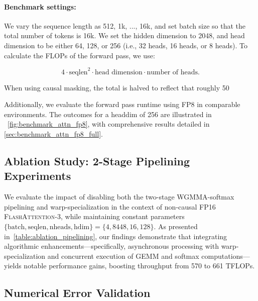 \begin{enumerate}
\paragraph{Benchmark settings:} We vary the sequence length as 512, 1k, ..., 16k, and set batch size so that the total number of tokens is 16k. We set the hidden dimension to 2048, and head dimension to be either 64, 128, or 256 (i.e., 32 heads, 16 heads, or 8 heads). To calculate the FLOPs of the forward pass, we use:

\begin{equation*}
  4 \cdot \text{seqlen}^2 \cdot \text{head dimension} \cdot \text{number of heads}.
\end{equation*}

When using causal masking, the total is halved to reflect that roughly 50%

Additionally, we evaluate the forward pass runtime using FP8 in comparable environments. The outcomes for a headdim of 256 are illustrated in ~\cref{fig:benchmark_attn_fp8}, with comprehensive results detailed in \cref{sec:benchmark_attn_fp8_full}.

\subsection{Ablation Study: 2-Stage Pipelining Experiments}
\label{sec:2-stage-pipelining-experiments}

We evaluate the impact of disabling both the two-stage WGMMA-softmax pipelining and warp-specialization in the context of non-causal FP16 \textsc{FlashAttention-3}, while maintaining constant parameters $\{\text{batch}, \text{seqlen}, \text{nheads}, \text{hdim}\} = \{ 4, 8448, 16, 128\}$. As presented in~\cref{table:ablation_pipelining}, our findings demonstrate that integrating algorithmic enhancements—specifically, asynchronous processing with warp-specialization and concurrent execution of GEMM and softmax computations—yields notable performance gains, boosting throughput from 570 to 661 TFLOPs.

\subsection{Numerical Error Validation}
\label{sec:numerical_error}


\end{enumerate}

